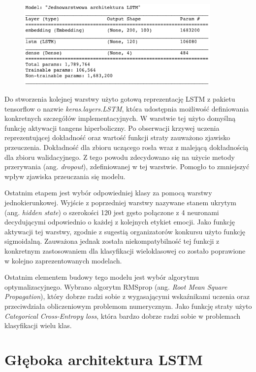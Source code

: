 \begin{figure}[t]
\centering\includegraphics[width=10cm]{figures/reports/lstm_one_table.png}
\label{rys:lstm_one_table}
\end{figure}

Do stworzenia kolejnej warstwy użyto gotową reprezentację LSTM z pakietu tensorflow o nazwie \textit{keras.layers.LSTM}, która udostępnia możliwość definiowania konkretnych szczegółów implementacyjnych. W warstwie tej użyto domyślną funkcję aktywacji tangens hiperboliczny. Po obserwacji krzywej uczenia reprezentującej dokładność oraz wartość funkcji straty zauważono zjawisko przeuczenia. Dokładność dla zbioru uczącego rosła wraz z malejącą dokładnością dla zbioru walidacyjnego. Z tego powodu zdecydowano się na użycie metody przerywania (ang. \textit{dropout}), zdefiniowanej w tej warstwie. Pomogło to zmniejszyć wpływ zjawiska przeuczania się modelu.

Ostatnim etapem jest wybór odpowiedniej klasy za pomocą warstwy jednokierunkowej. Wyjście z poprzedniej warstwy nazywane stanem ukrytym (ang. \textit{hidden state}) o szerokości 120 jest gęsto połączone z 4 neuronami decydującymi odpowiednio o każdej z kolejnych etykiet emocji. Jako funkcję aktywacji tej warstwy, zgodnie z sugestią organizatorów konkursu użyto funkcję sigmoidalną. Zauważona jednak została niekompatybilność tej funkcji z konkretnym zastosowaniem dla klasyfikacji wieloklasowej co zostało poprawione w kolejno zaprezentowanych modelach.  

Ostatnim elementem budowy tego modelu jest wybór algorytmu optymalizacyjnego. Wybrano algorytm RMSprop \cite{ruder2016overview} (ang. \textit{Root Mean Square Propagation}), który dobrze radzi sobie z wygasającymi wskaźnikami uczenia oraz przeciwdziała obliczeniowym problemom numerycznym. Jako funkcję straty użyto \textit{Categorical Cross-Entropy loss}, która bardzo dobrze radzi sobie w problemach klasyfikacji wielu klas.

\section{Głęboka architektura LSTM}

